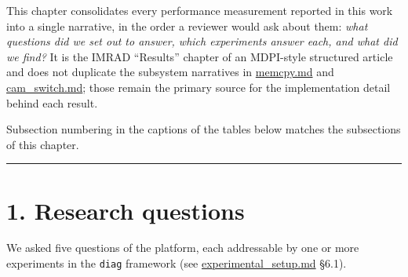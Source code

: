 This chapter consolidates every performance measurement reported in this
work into a single narrative, in the order a reviewer would ask about
them: \emph{what questions did we set out to answer, which experiments
answer each, and what did we find?} It is the IMRAD ``Results'' chapter
of an MDPI-style structured article and does not duplicate the subsystem
narratives in \url{memcpy.md} and \url{cam_switch.md}; those remain the
primary source for the implementation detail behind each result.

Subsection numbering in the captions of the tables below matches the
subsections of this chapter.

\begin{center}\rule{0.5\linewidth}{0.5pt}\end{center}

\section{1. Research questions}\label{research-questions}

We asked five questions of the platform, each addressable by one or more
experiments in the \texttt{diag} framework (see
\url{experimental_setup.md} §6.1).

